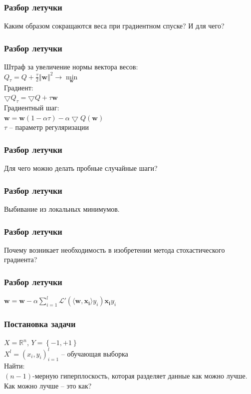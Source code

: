 \documentclass[12pt]{beamer}
\begin{document}
\begin{frame}\frametitle{Разбор летучки}
Каким образом сокращаются веса при градиентном спуске? И для чего?
\end{frame}

\begin{frame}\frametitle{Разбор летучки}
Штраф за увеличение нормы вектора весов:\\
$Q_{\tau} = Q + \frac{\tau}{2}\Vert \mathbf{w} \Vert^2 \rightarrow \min\limits_{\mathbf{w}}$\\
\vspace{5mm}
Градиент:\\
$\bigtriangledown Q_{\tau} = \bigtriangledown Q + \tau \mathbf{w}$\\
\vspace{5mm}
Градиентный шаг:\\
$\mathbf{w} = \mathbf{w}(1-\alpha \tau) - \alpha \bigtriangledown Q(\mathbf{w})$\\
$\tau$ -- параметр регуляризации
\end{frame}

\begin{frame}\frametitle{Разбор летучки}
Для чего можно делать пробные случайные шаги?
\end{frame}

\begin{frame}\frametitle{Разбор летучки}
Выбивание из локальных минимумов.
\end{frame}

\begin{frame}\frametitle{Разбор летучки}
Почему возникает необходимость в изобретении метода стохастического градиента? 
\end{frame}

\begin{frame}\frametitle{Разбор летучки}
$\mathbf{w} =  \mathbf{w} - \alpha \sum\limits_{i=1}^l \mathcal{L}'(\langle \mathbf{w}, \mathbf{x_i} \rangle y_i)\mathbf{x_i}y_i$\\
\end{frame}

\begin{frame}\frametitle{Постановка задачи}
$X = \mathbb{R}^n$, ${Y = \left\{ -1, + 1\right\}}$\\
${X^l = (x_i, y_i)_{i = 1}^l}$ -- обучающая выборка\\
\vspace{5mm}Найти:\\
$(n-1)$-мерную гиперплоскость, которая разделяет данные как можно лучше.
\\ \vspace{5mm}
Как можно лучше -- это как?

\end{frame}
\end{document}
